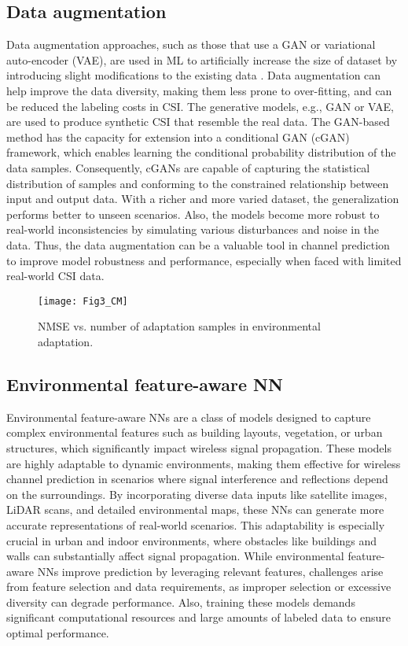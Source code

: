 \documentclass[lettersize,journal]{IEEEtran}
\begin{document}
\subsection{Data augmentation}
Data augmentation approaches, such as those that use a GAN or variational auto-encoder (VAE), are used in ML to artificially increase the size of dataset by introducing slight modifications to the existing data \cite{Raviv23}. Data augmentation can help improve the data diversity, making them less prone to over-fitting, and can be reduced the labeling costs in CSI. The generative models, e.g., GAN or VAE, are used to produce synthetic CSI that resemble the real data. 
The GAN-based method has the capacity for extension into a conditional GAN (cGAN) framework, which enables learning the conditional probability distribution of the data samples. Consequently, cGANs are capable of capturing the statistical distribution of samples and conforming to the constrained relationship between input and output data.
With a richer and more varied dataset, the generalization performs better to unseen scenarios. Also, the models become more robust to real-world inconsistencies by simulating various disturbances and noise in the data. Thus, the data augmentation can be a valuable tool in channel prediction to improve model robustness and performance, especially when faced with limited real-world CSI data.

\begin{figure}[!t]
	\centering
	\texttt{[image: Fig3\_CM]}
	\caption{NMSE vs. number of adaptation samples in environmental adaptation.}
	\label{fig_3}
\end{figure}

\subsection{Environmental feature-aware NN}
Environmental feature-aware NNs are a class of models designed to capture complex environmental features such as building layouts, vegetation, or urban structures, which significantly impact wireless signal propagation. These models are highly adaptable to dynamic environments, making them effective for wireless channel prediction in scenarios where signal interference and reflections depend on the surroundings. By incorporating diverse data inputs like satellite images, LiDAR scans, and detailed environmental maps, these NNs can generate more accurate representations of real-world scenarios. This adaptability is especially crucial in urban and indoor environments, where obstacles like buildings and walls can substantially affect signal propagation. While environmental feature-aware NNs improve prediction by leveraging relevant features, challenges arise from feature selection and data requirements, as improper selection or excessive diversity can degrade performance. Also, training these models demands significant computational resources and large amounts of labeled data to ensure optimal performance.
\end{document}
